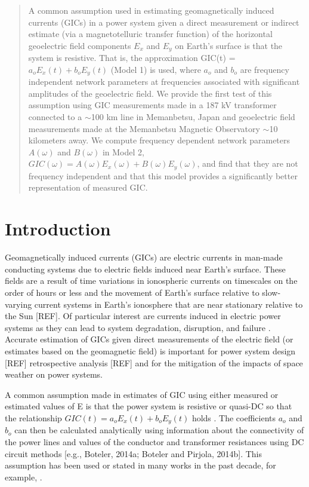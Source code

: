 \documentclass[draft,linenumbers]{agujournal2018}
\begin{document}
\begin{abstract}
A common assumption used in estimating geomagnetically induced currents (GICs) in a power system given a direct measurement or indirect estimate (via a magnetotelluric transfer function) of the horizontal geoelectric field components $E_x$ and $E_y$ on Earth’s surface is that the system is resistive. That is, the approximation GIC(t) = $a_oE_x(t) + b_oE_y(t)$ (Model 1) is used, where $a_o$ and $b_o$ are frequency independent network parameters at frequencies associated with significant amplitudes of the geoelectric field.  We provide the first test of this assumption using GIC measurements made in a 187 kV transformer connected to a $\sim$100 km line in Memanbetsu, Japan and geoelectric field measurements made at the Memanbetsu Magnetic Observatory $\sim$10 kilometers away.  We compute frequency dependent network parameters  $A(\omega)$ and $B(\omega)$ in Model 2, $GIC(\omega) = A(\omega)E_x(\omega) + B(\omega)E_y(\omega)$, and find that they are not frequency independent and that this model provides a significantly better representation of measured GIC.
\end{abstract}

\section{Introduction}

Geomagnetically induced currents (GICs) are electric currents in man-made conducting systems due to electric fields induced near Earth’s surface.  These fields are a result of time variations in ionospheric currents on timescales on the order of hours or less and the movement of Earth’s surface relative to slow-varying current systems in Earth’s ionosphere that are near stationary relative to the Sun [REF].  Of particular interest are currents induced in electric power systems as they can lead to system degradation, disruption, and failure \citep{Albertson1993,NERC2012}.  Accurate estimation of GICs given direct measurements of the electric field (or estimates based on the geomagnetic field) is important for power system design [REF] retrospective analysis [REF] and for the mitigation of the impacts of space weather on power systems.

A common assumption made in estimates of GIC using either measured or estimated values of E is that the power system is resistive or quasi-DC so that the relationship $GIC(t) = a_oE_x(t) + b_oE_y(t)$ holds \citep{Albertson1981,Lehtinen1985}.  The coefficients $a_o$ and $b_o$ can then be calculated analytically using information about the connectivity of the power lines and values of the conductor and transformer resistances using DC circuit methods [e.g., Boteler, 2014a; Boteler and Pirjola, 2014b]. This assumption has been used or stated in many works in the past decade, for example, \citet{Pulkkinen2007,Wik2008,Pulkkinen2010,Ngwira2011,Viljanen2012,Overbye2012}.
\end{document}
